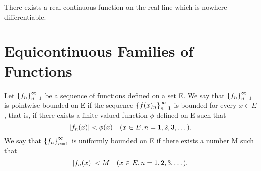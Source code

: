 \begin{theorem} %
  \label{thm:chap7:weierstrass_no_diff_func}
  There exists a real continuous function on the real line which is
  nowhere differentiable.
\end{theorem}

\section{Equicontinuous Families of Functions}
\label{sec:chap7:equicontinuous}


\begin{definition} %
  \label{def:chap7:boundedness_types}
  Let $\left\{ f_n \right\}_{n=1}^\infty$ be a sequence of functions defined on a set E.
  We say that $\left\{ f_n \right\}_{n=1}^\infty$ is pointwise bounded on E if the
  sequence $\left\{ f(x)_n \right\}_{n=1}^\infty$ is bounded for every $x \in E$, that is,
  if there exists a finite-valued function $\phi$ defined on E such that
  \[ \left\lvert f_n(x) \right\rvert < \phi(x) \quad (x \in E, n=1, 2, 3, \dots). \]
  We say that $\left\{ f_n \right\}_{n=1}^\infty$ is uniformly bounded on E if there
  exists a number M such that
  \[ \left\lvert f_n(x) \right\rvert < M \quad (x \in E, n=1, 2, 3, \dots). \]
\end{definition}

%

